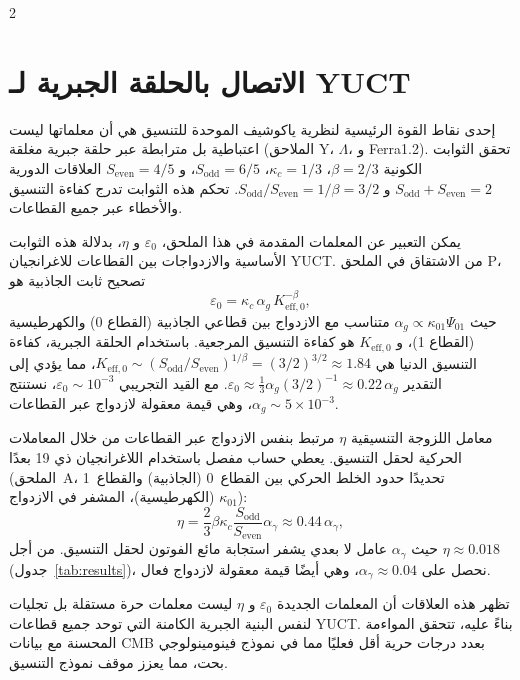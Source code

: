 \documentclass[11pt,a4paper]{article}
\begin{document}
\begin{multicols}{2}
		\section{الاتصال بالحلقة الجبرية لـ YUCT}
		\label{sec:algebraic}
		
		إحدى نقاط القوة الرئيسية لنظرية ياكوشيف الموحدة للتنسيق هي أن معلماتها ليست اعتباطية بل مترابطة عبر حلقة جبرية مغلقة (الملاحق Y، $\Lambda$، و Ferra1.2). تحقق الثوابت الكونية $\beta=2/3$، $\kappa_c=1/3$، $S_{\mathrm{odd}}=6/5$، و $S_{\mathrm{even}}=4/5$ العلاقات الدورية $S_{\mathrm{odd}}+S_{\mathrm{even}}=2$ و $S_{\mathrm{odd}}/S_{\mathrm{even}} = 1/\beta = 3/2$. تحكم هذه الثوابت تدرج كفاءة التنسيق والأخطاء عبر جميع القطاعات.
		
		يمكن التعبير عن المعلمات المقدمة في هذا الملحق، $\varepsilon_0$ و $\eta$، بدلالة هذه الثوابت الأساسية والازدواجات بين القطاعات للاغرانجيان YUCT. من الاشتقاق في الملحق P، تصحيح ثابت الجاذبية هو
		\begin{equation}
			\varepsilon_0 = \kappa_c \, \alpha_g \, K_{\mathrm{eff},0}^{-\beta},
		\end{equation}
		حيث $\alpha_g \propto \kappa_{01} \Psi_{01}$ متناسب مع الازدواج بين قطاعي الجاذبية (القطاع 0) والكهرطيسية (القطاع 1)، و $K_{\mathrm{eff},0}$ هو كفاءة التنسيق المرجعية. باستخدام الحلقة الجبرية، كفاءة التنسيق الدنيا هي $K_{\mathrm{eff},0} \sim (S_{\mathrm{odd}}/S_{\mathrm{even}})^{1/\beta} = (3/2)^{3/2} \approx 1.84$، مما يؤدي إلى التقدير $\varepsilon_0 \approx \frac{1}{3} \alpha_g (3/2)^{-1} \approx 0.22\,\alpha_g$. مع القيد التجريبي $\varepsilon_0 \sim 10^{-3}$، نستنتج $\alpha_g \sim 5\times10^{-3}$، وهي قيمة معقولة لازدواج عبر القطاعات.
		
		معامل اللزوجة التنسيقية $\eta$ مرتبط بنفس الازدواج عبر القطاعات من خلال المعاملات الحركية لحقل التنسيق. يعطي حساب مفصل باستخدام اللاغرانجيان ذي 19 بعدًا (الملحق~A، تحديدًا حدود الخلط الحركي بين القطاع~0 (الجاذبية) والقطاع~1 (الكهرطيسية)، المشفر في الازدواج \(\kappa_{01}\)):
		\begin{equation}
			\eta = \frac{2}{3} \beta \kappa_c \frac{S_{\mathrm{odd}}}{S_{\mathrm{even}}} \alpha_\gamma \approx 0.44 \, \alpha_\gamma,
		\end{equation}
		حيث $\alpha_\gamma$ عامل لا بعدي يشفر استجابة مائع الفوتون لحقل التنسيق. من أجل $\eta \approx 0.018$ (جدول~\ref{tab:results})، نحصل على $\alpha_\gamma \approx 0.04$، وهي أيضًا قيمة معقولة لازدواج فعال.
		
		تظهر هذه العلاقات أن المعلمات الجديدة $\varepsilon_0$ و $\eta$ ليست معلمات حرة مستقلة بل تجليات لنفس البنية الجبرية الكامنة التي توحد جميع قطاعات YUCT. بناءً عليه، تتحقق المواءمة المحسنة مع بيانات CMB بعدد درجات حرية أقل فعليًا مما في نموذج فينومينولوجي بحت، مما يعزز موقف نموذج التنسيق.
		
	\end{multicols}
	
\end{document}
